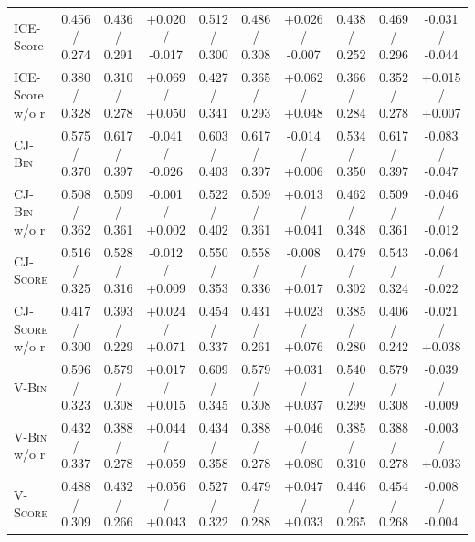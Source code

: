 \begin{table}[t]
\begin{tabular}{@{}
        l|ccc|ccc|ccc@{}}
        \midrule
        \midrule
        ICE-Score               & 0.456 / 0.274   & 0.436 / 0.291   & +0.020 / -0.017                     & 0.512 / 0.300   & 0.486 / 0.308   & +0.026 / -0.007                     & 0.438 / 0.252   & 0.469 / 0.296   & -0.031 / -0.044                     \\
        ICE-Score w/o r         & 0.380 / 0.328   & 0.310 / 0.278   & +0.069 / +0.050                     & 0.427 / 0.341   & 0.365 / 0.293   & +0.062 / +0.048                     & 0.366 / 0.284   & 0.352 / 0.278   & +0.015 / +0.007                     \\
        \midrule
        \textsc{CJ-Bin}         & 0.575 / 0.370   & 0.617 / 0.397   & -0.041 / -0.026                     & 0.603 / 0.403   & 0.617 / 0.397   & -0.014 / +0.006                     & 0.534 / 0.350   & 0.617 / 0.397   & -0.083 / -0.047                     \\
        \textsc{CJ-Bin} w/o r   & 0.508 / 0.362   & 0.509 / 0.361   & -0.001 / +0.002                     & 0.522 / 0.402   & 0.509 / 0.361   & +0.013 / +0.041                     & 0.462 / 0.348   & 0.509 / 0.361   & -0.046 / -0.012                     \\
        \midrule
        \textsc{CJ-Score}       & 0.516 / 0.325   & 0.528 / 0.316   & -0.012 / +0.009                     & 0.550 / 0.353   & 0.558 / 0.336   & -0.008 / +0.017                     & 0.479 / 0.302   & 0.543 / 0.324   & -0.064 / -0.022                     \\
        \textsc{CJ-Score} w/o r & 0.417 / 0.300   & 0.393 / 0.229   & +0.024 / +0.071                     & 0.454 / 0.337   & 0.431 / 0.261   & +0.023 / +0.076                     & 0.385 / 0.280   & 0.406 / 0.242   & -0.021 / +0.038                     \\
        \midrule
        \textsc{V-Bin}          & 0.596 / 0.323   & 0.579 / 0.308   & +0.017 / +0.015                     & 0.609 / 0.345   & 0.579 / 0.308   & +0.031 / +0.037                     & 0.540 / 0.299   & 0.579 / 0.308   & -0.039 / -0.009                     \\
        \textsc{V-Bin} w/o r    & 0.432 / 0.337   & 0.388 / 0.278   & +0.044 / +0.059                     & 0.434 / 0.358   & 0.388 / 0.278   & +0.046 / +0.080                     & 0.385 / 0.310   & 0.388 / 0.278   & -0.003 / +0.033                     \\
        \midrule
        \textsc{V-Score}        & 0.488 / 0.309   & 0.432 / 0.266   & +0.056 / +0.043                     & 0.527 / 0.322   & 0.479 / 0.288   & +0.047 / +0.033                     & 0.446 / 0.265   & 0.454 / 0.268   & -0.008 / -0.004                     \\

\end{tabular}
\end{table}
